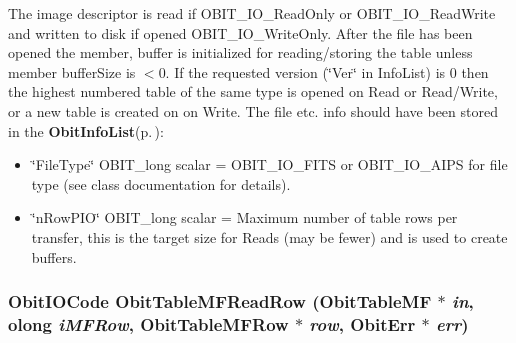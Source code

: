 The image descriptor is read if OBIT\_\-IO\_\-Read\-Only or OBIT\_\-IO\_\-Read\-Write and written to disk if opened OBIT\_\-IO\_\-Write\-Only. After the file has been opened the member, buffer is initialized for reading/storing the table unless member buffer\-Size is $<$0. If the requested version (\char`\"{}Ver\char`\"{} in Info\-List) is 0 then the highest numbered table of the same type is opened on Read or Read/Write, or a new table is created on on Write. The file etc. info should have been stored in the {\bf Obit\-Info\-List}{\rm (p.\,\pageref{structObitInfoList})}: \begin{itemize}
\item \char`\"{}File\-Type\char`\"{} OBIT\_\-long scalar = OBIT\_\-IO\_\-FITS or OBIT\_\-IO\_\-AIPS for file type (see class documentation for details). \item \char`\"{}n\-Row\-PIO\char`\"{} OBIT\_\-long scalar = Maximum number of table rows per transfer, this is the target size for Reads (may be fewer) and is used to create buffers. 
\end{itemize}
\subsubsection{\setlength{\rightskip}{0pt plus 5cm}Obit\-IOCode Obit\-Table\-MFRead\-Row ({\bf Obit\-Table\-MF} $\ast$ {\em in}, {\bf olong} {\em i\-MFRow}, {\bf Obit\-Table\-MFRow} $\ast$ {\em row}, {\bf Obit\-Err} $\ast$ {\em err})}\label{ObitTableMF_8c_a22}


